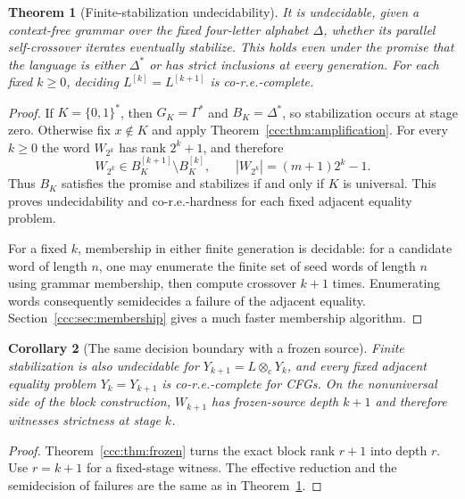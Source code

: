 \documentclass[11pt,letterpaper]{article}
\newtheorem{theorem}{Theorem}[section]
\newtheorem{corollary}[theorem]{Corollary}
\theoremstyle{definition}
\theoremstyle{remark}
\newcommand{\cut}{\otimes_{\mathrm c}}
\newcommand{\gen}[2]{#1^{[#2]}}
\begin{document}
\begin{theorem}[Finite-stabilization undecidability]\label{ccc:thm:eventual}
It is undecidable, given a context-free grammar over the fixed four-letter
alphabet $\Delta$, whether its parallel self-crossover iterates eventually
stabilize. This holds even under the promise that the language is either
$\Delta^*$ or has strict inclusions at every generation.
For each fixed $k\geq0$, deciding
$\gen Lk=\gen L{k+1}$ is co-r.e.-complete.
\end{theorem}
\begin{proof}
If $K=\{0,1\}^*$, then $G_K=\Gamma^*$ and $B_K=\Delta^*$, so stabilization
occurs at stage zero. Otherwise fix $x\notin K$ and apply
Theorem~\ref{ccc:thm:amplification}. For every $k\geq0$ the word $W_{2^k}$ has
rank $2^k+1$, and therefore
\begin{equation}
 W_{2^k}\in\gen{B_K}{k+1}\setminus\gen{B_K}k,
 \qquad |W_{2^k}|=(m+1)2^k-1.
 \label{ccc:eq:strictwitness}
\end{equation}
Thus $B_K$ satisfies the promise and stabilizes if and only if $K$ is
universal. This proves undecidability and co-r.e.-hardness for each fixed
adjacent equality problem.

For a fixed $k$, membership in either finite generation is decidable: for a
candidate word of length $n$, one may enumerate the finite set of seed words
of length $n$ using grammar membership, then compute crossover $k+1$ times.
Enumerating words consequently semidecides a failure of the adjacent equality.
Section~\ref{ccc:sec:membership} gives a much faster membership algorithm.
\end{proof}


\begin{corollary}[The same decision boundary with a frozen source]
\label{ccc:cor:frozenundecidable}
Finite stabilization is also undecidable for $Y_{k+1}=L\cut Y_k$, and every
fixed adjacent equality problem $Y_k=Y_{k+1}$ is co-r.e.-complete for CFGs.
On the nonuniversal side of the block construction, $W_{k+1}$ has frozen-source
depth $k+1$ and therefore witnesses strictness at stage $k$.
\end{corollary}
\begin{proof}
Theorem~\ref{ccc:thm:frozen} turns the exact block rank $r+1$ into depth $r$.
Use $r=k+1$ for a fixed-stage witness. The effective reduction and the
semidecision of failures are the same as in Theorem~\ref{ccc:thm:eventual}.
\end{proof}
\end{document}
